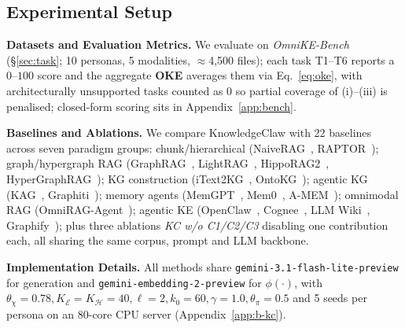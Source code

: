 \documentclass{article}
\begin{document}
\subsection{Experimental Setup}

\textbf{Datasets and Evaluation Metrics.} We evaluate on \emph{OmniKE-Bench} (\S\ref{sec:task}; 10 personas, 5 modalities, $\approx$4{,}500 files); each task T1--T6 reports a $0$--$100$ score and the aggregate \textbf{OKE} averages them via Eq.~\eqref{eq:oke}, with architecturally unsupported tasks counted as $0$ so partial coverage of (i)--(iii) is penalised; closed-form scoring sits in Appendix~\ref{app:bench}.

\textbf{Baselines and Ablations.} We compare KnowledgeClaw with 22 baselines across seven paradigm groups: chunk/hierarchical (NaiveRAG~\citep{RAG}, RAPTOR~\citep{RAPTOR}); graph/hypergraph RAG (GraphRAG~\citep{GraphRAG}, LightRAG~\citep{LightRAG}, HippoRAG2~\citep{HippoRAG2}, HyperGraphRAG~\citep{HyperGraphRAG}); KG construction (iText2KG~\citep{iText2KG}, OntoKG~\citep{OntoKG}); agentic KG (KAG~\citep{KAG}, Graphiti~\citep{Graphiti}); memory agents (MemGPT~\citep{MemGPT}, Mem0~\citep{Mem0}, A-MEM~\citep{A-MEM}); omnimodal RAG (OmniRAG-Agent~\citep{OmniRAG-Agent}); agentic KE (OpenClaw~\citep{OpenClaw}, Cognee~\citep{Cognee}, LLM Wiki~\citep{LLMWiki}, Graphify~\citep{Graphify}); plus three ablations \emph{KC w/o C1/C2/C3} disabling one contribution each, all sharing the same corpus, prompt and LLM backbone.

\textbf{Implementation Details.} All methods share \texttt{gemini-3.1-flash-lite-preview} for generation and \texttt{gemini-embedding-2-preview} for $\phi(\cdot)$, with $\theta_{\chi}\!=\!0.78,K_{\mathcal{E}}\!=\!K_{\mathcal{H}}\!=\!40,\ell\!=\!2,k_0\!=\!60,\gamma\!=\!1.0,\theta_{\pi}\!=\!0.5$ and 5 seeds per persona on an 80-core CPU server (Appendix~\ref{app:b-kc}).

\clearpage
\end{document}
